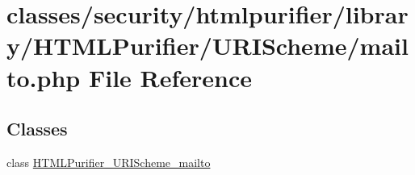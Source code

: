 \hypertarget{mailto_8php}{\section{classes/security/htmlpurifier/library/\+H\+T\+M\+L\+Purifier/\+U\+R\+I\+Scheme/mailto.php File Reference}
\label{mailto_8php}
}
\subsection*{Classes}
\begin{DoxyCompactItemize}
\item 
class \hyperlink{classHTMLPurifier__URIScheme__mailto}{H\+T\+M\+L\+Purifier\+\_\+\+U\+R\+I\+Scheme\+\_\+mailto}
\end{DoxyCompactItemize}
